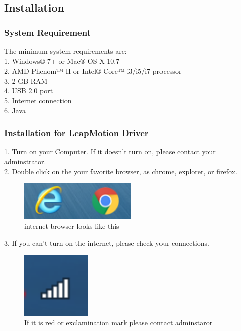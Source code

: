 \documentclass[10pt,journal,compsoc]{IEEEtran}
\begin{document}
\subsection{Installation}
\subsubsection{System Requirement}
The minimum system requirements are:\\
1. Windows® 7+ or Mac® OS X 10.7+\\
2. AMD Phenom™ II or Intel® Core™ i3/i5/i7 processor\\
3. 2 GB RAM\\
4. USB 2.0 port\\
5. Internet connection\\
6. Java 
\subsubsection{Installation for LeapMotion Driver}
1. Turn on your Computer. If it doesn't turn on, please contact your adminstrator.\\
2. Double click on the your favorite browser, as chrome, explorer, or firefox.\\ 

\begin{figure}[H]
\centering
\includegraphics[width=0.5\textwidth]{Internet.png}
{\caption*{internet browser looks like this}}
\end{figure}
3. If you can't turn on the internet, please check your connections.\\ 
\begin{figure}[H]
\centering
\includegraphics[width=0.3\textwidth]{Connection.png}
{\caption*{If it is red or exclamination mark
		  please contact adminstaror }}
\end{figure}
\end{document}
